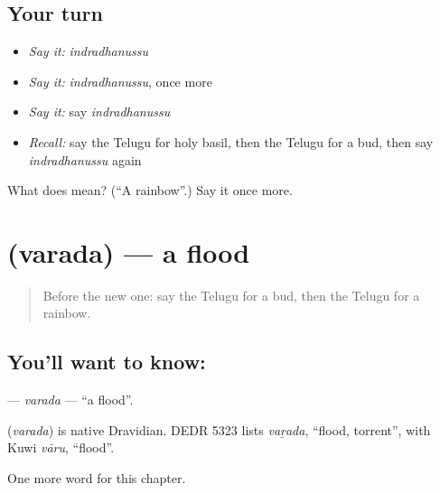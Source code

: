 \subsection*{Your turn}
\begin{itemize}
\raggedright
  \item \emph{Say it:} \emph{indradhanussu}
  \item \emph{Say it:} \emph{indradhanussu}, once more
  \item \emph{Say it:} say \emph{indradhanussu}
  \item \emph{Recall:} say the Telugu for holy basil, then the Telugu for a bud, then say \emph{indradhanussu} again
\end{itemize}

\begin{tcolorbox}[breakable,colback=teal!4,colframe=teal!35!black,title={Before you move on}]
What does  mean? (\textquotedblleft{}A rainbow\textquotedblright{}.) Say it once more.
\end{tcolorbox}
\section[\texorpdfstring{\te{వరద} (varada)}{వరద (varada)}]{ (varada) — a flood}

\label{lesson:TE-C267-varada}



\begin{quote}
Before the new one: say the Telugu for a bud, then the Telugu for a rainbow.
\end{quote}

\subsection*{You'll want to know: }
\textbf{} — \emph{varada} — \textquotedblleft{}a flood\textquotedblright{}.

\begin{cousinweb}
\textbf{} (\emph{varada}) is native Dravidian. DEDR 5323 lists \emph{vaṟada}, \textquotedblleft{}flood, torrent\textquotedblright{}, with Kuwi \emph{vāru}, \textquotedblleft{}flood\textquotedblright{}.
\end{cousinweb}

\begin{grammarlens}[title={What you've built}]
One more word for this chapter.
\end{grammarlens}

